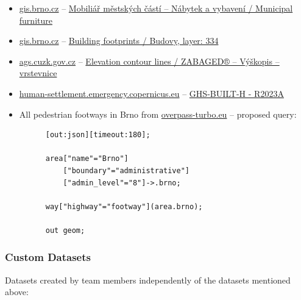 \documentclass[11pt,a4paper]{article}
\begin{document}
\begin{itemize}
  \item \href{https://gis.brno.cz}{gis.brno.cz} -- \href{https://gis.brno.cz/ost/edas/public/99620902-b124-46a1-9d96-dd1b03bed311}{Mobiliář městských částí -- Nábytek a vybavení / Municipal furniture}

  \item \href{https://gis.brno.cz}{gis.brno.cz} -- \href{https://gis.brno.cz/ags3/rest/services/PUBLIC/basemap_brno_zakladni_mapa_seda_3D_tiled/MapServer/334/}{Building footprints / Budovy, layer: 334}

  \item \href{https://ags.cuzk.gov.cz}{ags.cuzk.gov.cz} -- \href{https://ags.cuzk.gov.cz/arcgis/rest/services/ZABAGED_VRSTEVNICE/MapServer/0/}{Elevation contour lines / ZABAGED® -- Výškopis -- vrstevnice}

  \item \href{https://human-settlement.emergency.copernicus.eu}{human-settlement.emergency.copernicus.eu} -- \href{https://human-settlement.emergency.copernicus.eu/ghs_buH2023.php}{GHS-BUILT-H - R2023A}
  
  \item All pedestrian footways in Brno from \href{https://overpass-turbo.eu}{overpass-turbo.eu} -- proposed query:

    \begin{minipage}{\linewidth}
    \vspace*{12pt}
    \small
      \begin{verbatim}
      [out:json][timeout:180];

      area["name"="Brno"]
          ["boundary"="administrative"]
          ["admin_level"="8"]->.brno;

      way["highway"="footway"](area.brno);

      out geom;
      \end{verbatim}
    \end{minipage}

\end{itemize}

\clearpage

\subsubsection{Custom Datasets}

Datasets created by team members independently of the datasets mentioned above:
\end{document}
